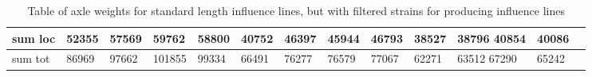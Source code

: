 \begin{table}[h]
\begin{adjustbox}{center}
\begin{tabularx}{0.9\pagewidth}{ |X|X|X|X|X|X|X|X|X|X|X|X|X| }
      \hline
      sum loc & 52355   &    57569   &    59762   &    58800   &    40752   &    46397   &    45944   &    46793    &   38527   &    38796       40854    &   40086 \\
      \hline
      sum tot & 86969   &    97662   &   101855   &    99334   &    66491   &    76277   &    76579   &    77067    &   62271   &    63512       67290    &   65242 \\
      \hline
    \end{tabularx}
  \end{adjustbox}
  \caption{Table of axle weights for standard length influence lines, but with filtered strains for producing influence lines}
  \label{table:long_infl}
\end{table}
